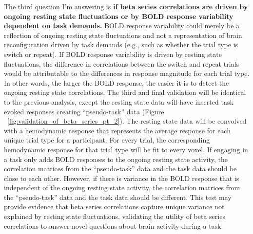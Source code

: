 \documentclass[phd,appendix,figures]{uithesis}
\begin{document}
The third question I'm answering is \textbf{if beta series correlations are driven by ongoing resting state fluctuations or by BOLD response variability dependent on task demands.}
BOLD response variability could merely be a reflection of ongoing resting state fluctuations and not a representation of brain reconfiguration driven by task demands (e.g., such as whether the trial type is switch or repeat).
If BOLD response variability is driven by resting state fluctuations, the difference in correlations between the switch and repeat trials would be attributable to the differences in response magnitude for each trial type.
In other words, the larger the BOLD response, the easier it is to detect the ongoing resting state correlations.
The third and final validation will be identical to the previous analysis, except the resting state data will have inserted task evoked responses creating “pseudo-task” data (Figure ~\ref{fig:validation_of_beta_series_pt_2}).
The resting state data will be convolved with a hemodynamic response that represents the average response for each unique trial type for a participant.
For every trial, the corresponding hemodynamic response for that trial type will be fit to every voxel.
If engaging in a task only adds BOLD responses to the ongoing resting state activity, the correlation matrices from the “pseudo-task” data and the task data should be close to each other.
However, if there is variance in the BOLD response that is independent of the ongoing resting state activity, the correlation matrices from the “pseudo-task” data and the task data should be different.
This test may provide evidence that beta series correlations capture unique variance not explained by resting state fluctuations, validating the utility of beta series correlations to answer novel questions about brain activity during a task.
\end{document}
